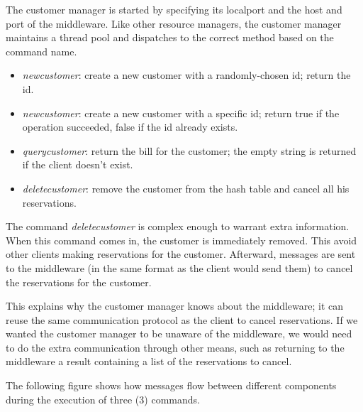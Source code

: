 \documentclass[11pt]{article}
\begin{document}
The customer manager is started by specifying its localport and the
host and port of the middleware.  Like other resource managers, the
customer manager maintains a thread pool and dispatches to the correct
method based on the command name.


\begin{itemize}
\item {\it newcustomer}: create a new customer with a randomly-chosen
  id; return the id.
\item {\it newcustomer}: create a new customer with a specific id;
  return true if the operation succeeded, false if the id already exists.
\item {\it querycustomer}: return the bill for the customer; the empty
  string is returned if the client doesn't exist.
\item {\it deletecustomer}: remove the customer from the hash table
  and cancel all his reservations.
\end{itemize}

The command {\it deletecustomer} is complex enough to warrant extra
information.  When this command comes in, the customer is immediately
removed.  This avoid other clients making reservations for the
customer. Afterward, messages are sent to the middleware (in the same
format as the client would send them) to cancel the reservations for
the customer.

This explains why the customer manager knows about the middleware; it
can reuse the same communication protocol as the client to cancel
reservations.  If we wanted the customer manager to be unaware of the
middleware, we would need to do the extra communication through other
means, such as returning to the middleware a result containing a list
of the reservations to cancel.

The following figure shows how messages flow between different
components during the execution of three (3) commands.
\end{document}
